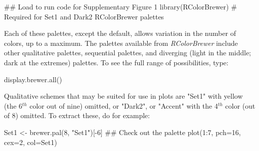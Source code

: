 \begin{fullwidth}
\begin{Schunk}
\begin{Sinput}
## Load to run code for Supplementary Figure 1
library(RColorBrewer)   # Required for Set1 and Dark2 RColorBrewer palettes
\end{Sinput}
\end{Schunk}

\begin{Schunk}
\begin{Sinput}
colpal <- rev(list(
    "Default palette" = palette()[1:8],  cm.colors = cm.colors(12),
    terrain.colors = terrain.colors(12), heat.colors = heat.colors(12),
    blueRamp = colorRampPalette(c(blues9, "white"))(12),
    "Brewer-Set1" = brewer.pal(8, "Set1"),
    "Brewer-Dark2" = brewer.pal(8, "Dark2")))
palnam <- names(colpal)
plot(1, 1, xlim=c(0.5,12.5), ylim=c(0,length(palnam)+0.5), type="n",
     axes=FALSE, xlab="", ylab="")
for(i in 1:length(palnam)){
    len <- length(colpal[[i]])
    points(1:len, rep(i,len), pch=15, col=colpal[[i]], cex=5.5)
    legend(1, i+0.025, palnam[i], adj=0, box.col="white", bg="white",
           x.intersp=0, y.intersp=0, yjust=0)
\end{Sinput}
\end{Schunk}
\end{fullwidth}
Each of these palettes, except the default, allows variation in the
number of colors, up to a maximum.  The palettes available from {\em
  RColorBrewer} include other qualitative palettes, sequential
palettes, and diverging (light in the middle; dark at the extremes)
palettes.  To see the full range of  possibilities,
type: 
\begin{Schunk}
\begin{Sinput}
display.brewer.all()
\end{Sinput}
\end{Schunk}
\noindent
{}  Qualitative schemes that may be
suited for use in plots are "Set1" with yellow (the 6$^{th}$ color out
of nine) omitted, or "Dark2", or "Accent" with the 4$^{th}$ color
(out of 8) omitted.  To extract these, do for example:
\begin{Schunk}
\begin{Sinput}
Set1 <- brewer.pal(8, "Set1")[-6]
## Check out the palette
plot(1:7, pch=16, cex=2, col=Set1)
\end{Sinput}
\end{Schunk}

